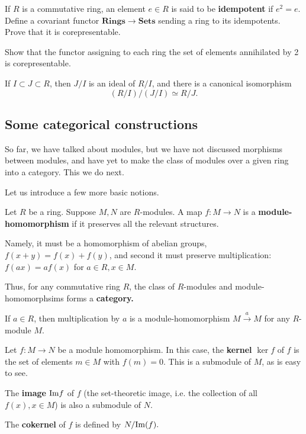\begin{exercise} If $R$ is a commutative ring, an element $e \in R$ is said to
be \textbf{idempotent} if $e^2 = e$. Define a covariant functor $\mathbf{Rings}
\to \mathbf{Sets}$ sending a ring to its idempotents. Prove that it is
corepresentable. \end{exercise}

\begin{exercise} Show that the functor assigning to each ring the set of
elements annihilated by 2 is corepresentable. \end{exercise}

\begin{exercise} If $I \subset J \subset R$, then $J/I$ is an ideal of $R/I$,
and there is a canonical isomorphism \[ (R/I)/(J/I) \simeq R/J. \]
\end{exercise}

\subsection{Some categorical constructions} So far, we have talked about
modules, but we have not discussed morphisms between modules, and have yet to
make the class of modules over a given ring into a category. This we do next.

Let us introduce a few more basic notions.

\begin{definition} Let $R$ be a ring. Suppose $M,N$ are $R$-modules. A map $f:
M \to N$ is a \textbf{module-homomorphism} if it preserves all the relevant
structures.

Namely, it must be a homomorphism of abelian groups, $f(x+y) = f(x) + f(y)$,
and second it must preserve multiplication: $f(ax) = af(x)$ for $a \in R, x \in
M$. \end{definition}

Thus, for any commutative ring $R$, the class of $R$-modules and
module-homomorphsims forms a \textbf{category.}

\begin{example} If $a \in R$, then multiplication by $a$ is a
module-homomorphism $M \stackrel{a}{\to} M$ for any $R$-module $M$.
\end{example}

\begin{definition} Let $f: M \to N$ be a module homomorphism. In this case, the
\textbf{kernel} $\ker f$ of $f$ is the set of elements $m \in M$ with $f(m)=0$.
This is a submodule of $M$, as is easy to see.

The \textbf{image} $\mathrm{Im} f$ of $f$ (the set-theoretic image, i.e. the collection
of all $f(x), x \in M$) is also a submodule of $N$.

The \textbf{cokernel} of $f$ is defined by \( N/\mathrm{Im}(f). \) \end{definition}


